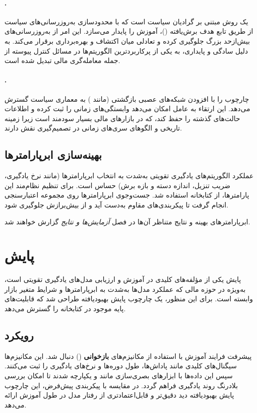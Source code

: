\documentclass[12pt, a4paper]{report}
\begin{document}
\paragraph{.}
 یک روش مبتنی بر گرادیان سیاست است که با محدودسازی به‌روزرسانی‌های سیاست از طریق تابع هدف برش‌یافته ()، آموزش را پایدار می‌سازد.  
این امر از به‌روزرسانی‌های بیش‌ازحد بزرگ جلوگیری کرده و تعادلی میان اکتشاف و بهره‌برداری برقرار می‌کند.  
به دلیل سادگی و پایداری،  به یکی از پرکاربردترین الگوریتم‌ها در مسائل کنترل پیوسته از جمله معامله‌گری مالی تبدیل شده است.  




\paragraph{.}
 چارچوب  را با افزودن شبکه‌های عصبی بازگشتی (مانند ) به معماری سیاست گسترش می‌دهد.  
این ارتقاء به عامل امکان می‌دهد وابستگی‌های زمانی را ثبت کرده و اطلاعات حالت‌های گذشته را حفظ کند، 
که در بازارهای مالی بسیار سودمند است زیرا زمینه تاریخی و الگوهای سری‌های زمانی در تصمیم‌گیری نقش دارند.  

\subsection{بهینه‌سازی ابرپارامترها}
عملکرد الگوریتم‌های یادگیری تقویتی به‌شدت به انتخاب ابرپارامترها (مانند نرخ یادگیری، ضریب تنزیل، اندازه دسته و بازه برش) حساس است.  
برای تنظیم نظام‌مند این پارامترها، از کتابخانه  استفاده شد.  
جست‌وجوی ابرپارامترها روی مجموعه اعتبارسنجی انجام گرفت تا پیکربندی‌های مقاوم به‌دست آید و از بیش‌برازش جلوگیری شود.  

ابرپارامترهای بهینه و نتایج متناظر آن‌ها در فصل \textit{آزمایش‌ها و نتایج} گزارش خواهند شد.  

\section{پایش}
\label{sec:monitoring}

پایش یکی از مؤلفه‌های کلیدی در آموزش و ارزیابی مدل‌های یادگیری تقویتی است، 
به‌ویژه در حوزه مالی که عملکرد مدل‌ها به‌شدت به ابرپارامترها و شرایط متغیر بازار وابسته است.  
برای این منظور، یک چارچوب پایش بهبودیافته طراحی شد که قابلیت‌های پایه موجود در کتابخانه  را گسترش می‌دهد.  

\subsection{رویکرد}
پیشرفت فرایند آموزش با استفاده از مکانیزم‌های \textbf{بازخوانی} () دنبال شد.  
این مکانیزم‌ها سیگنال‌های کلیدی مانند پاداش‌ها، طول دوره‌ها و نرخ‌های یادگیری را ثبت می‌کنند.  
سپس این داده‌ها با ابزارهای بصری‌سازی مانند  و  یکپارچه شدند 
تا امکان بررسی بلادرنگ روند یادگیری فراهم گردد.  
در مقایسه با پیکربندی پیش‌فرض، این چارچوب پایش بهبودیافته دید دقیق‌تر و قابل‌اعتمادتری از رفتار مدل در طول آموزش ارائه می‌دهد.  
\end{document}

